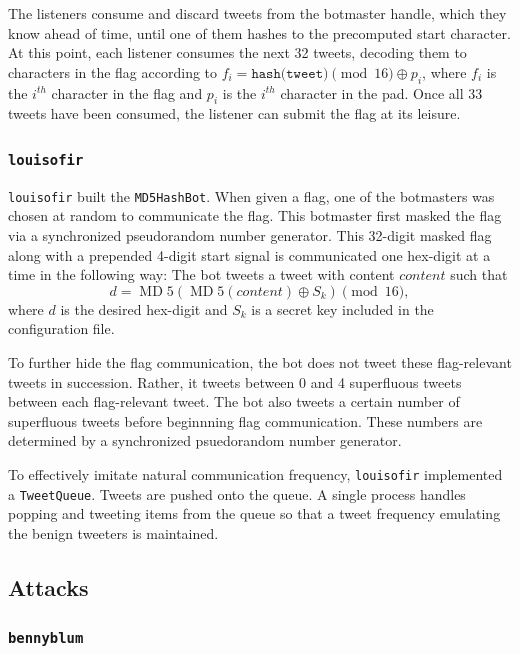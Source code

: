 \documentclass[11pt, oneside]{article} %
\numberwithin{equation}{section} %
\numberwithin{figure}{section} %
\numberwithin{table}{section} %
\renewcommand{\c}[1]{\texttt{#1}}
\newcommand{\teambb}{\c{bennyblum}}
\newcommand{\teamol}{\c{louisofir}}
\DeclareMathOperator{\MD}{MD}
\begin{document}
            The listeners consume and discard tweets from the botmaster handle, which they know ahead of time, until one of them hashes to the precomputed start character. At this point, each listener consumes the next 32 tweets, decoding them to characters in the flag according to $f_i = \texttt{hash(tweet)} \pmod{16} \oplus p_i$, where $f_i$ is the $i^{th}$ character in the flag and $p_i$ is the $i^{th}$ character in the pad. Once all 33 tweets have been consumed, the listener can submit the flag at its leisure.
		\subsubsection{\teamol{}}
			\teamol{} built the \c{MD5HashBot}. When given a flag, one of the botmasters was chosen at random to communicate the flag. This botmaster first masked the flag via a synchronized pseudorandom number generator. This 32-digit masked flag along with a prepended 4-digit start signal is communicated one hex-digit at a time in the following way: The bot tweets a tweet with content $content$ such that
			\[
				d=\MD5(\MD5(content)\oplus S_k) \pmod{16},
			\] 
			where $d$ is the desired hex-digit and $S_k$ is a secret key included in the configuration file.

			To further hide the flag communication, the bot does not tweet these flag-relevant tweets in succession. Rather, it tweets between 0 and 4 superfluous tweets between each  flag-relevant tweet. The bot also tweets a certain number of superfluous tweets before beginnning flag communication. These numbers are determined by a synchronized psuedorandom number generator.

			To effectively imitate natural communication frequency, \teamol{} implemented a \c{TweetQueue}. Tweets are pushed onto the queue. A single process handles popping and tweeting items from the queue so that a tweet frequency emulating the benign tweeters is maintained.
	\subsection{Attacks}
		\subsubsection{\teambb{}}
\end{document}
